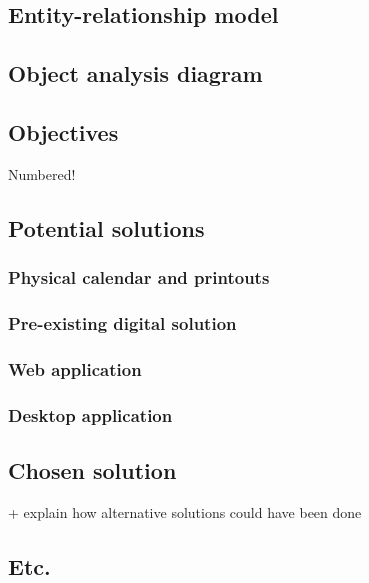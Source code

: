 \subsection{Entity-relationship model}
\lipsum
\subsection{Object analysis diagram}
\lipsum
\subsection{Objectives}

Numbered!


\subsection{Potential solutions}

\subsubsection{Physical calendar and printouts}
\subsubsection{Pre-existing digital solution}
\subsubsection{Web application}
\subsubsection{Desktop application}

\subsection{Chosen solution}

+ explain how alternative solutions could have been done

\subsection{Etc.}
